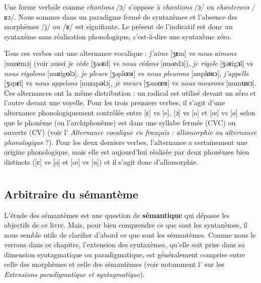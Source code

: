 {     Une forme verbale comme \textit{chantons} /ɔ/ s’oppose à \textit{chantions} /ɔ/ ou \textit{chanterons} /ʁɔ/. Nous sommes dans un paradigme fermé de syntaxèmes et l’absence des morphèmes /j/ ou /ʁ/ est signifiante. Le présent de l’indicatif est donc un syntaxème sans réalisation phonologique, c’est-à-dire une syntaxème zéro.

     Tous ces verbes ont une alternance vocalique : \textit{j’aime} [ʒ\textbf{ɛ}m] vs \textit{nous aimons} [nuz\textbf{e}mɔ] (voir aussi \textit{je cède} [ʒǝs\textbf{ɛ}d] vs \textit{nous cédons} [nus\textbf{e}dɔ]), \textit{je rigole} [ʒǝʁig\textbf{ɔ}l] vs \textit{nous rigolons} [nuʁig\textbf{o}lɔ], \textit{je pleure} [ʒǝpl\textbf{œ}ʁ] vs \textit{nous pleurons} [nupl\textbf{ø}ʁɔ], \textit{j’appelle} [ʒap\textbf{ɛ}l] vs \textit{nous appelons} [nuzap\textbf{ǝ}lɔ], \textit{je meurs} [ʒǝm\textbf{œ}ʁ] vs \textit{nous mourons} [num\textbf{u}ʁɔ]. Ces alternances ont la même distribution : un radical est utilisé devant un zéro et l’autre devant une voyelle. Pour les trois premiers verbes, il s’agit d’une alternance phonologiquement contrôlée entre [ɛ] vs [e], [ɔ] vs [o] et [œ] vs [ø] selon que le phonème (ou l’archiphonème) est dans une syllabe fermée (CVC) ou ouverte (CV) (voir l’ \textit{Alternance vocalique en français : allomorphie ou alternance phonologique} ?). Pour les deux derniers verbes, l’alternance a certainement une origine phonologique, mais elle est aujourd’hui réalisée par deux phonèmes bien distincts ([ɛ] vs [ǝ] et [œ] vs [u]) et il s’agit donc d’allomorphie.
}
\chapter{}\label{sec:2.3}

\section{Arbitraire du sémantème}\label{sec:2.3.0}

L’étude des sémantèmes est une question de \textbf{sémantique} qui dépasse les objectifs de ce livre. Mais, pour bien comprendre ce que sont les syntaxèmes, il nous semble utile de clarifier d’abord ce que sont les sémantèmes. Comme nous le verrons dans ce chapitre, l’extension des syntaxèmes, qu’elle soit prise dans sa dimension syntagmatique ou paradigmatique, est généralement comprise entre celle des morphèmes et celle des sémantèmes (voir notamment l’ sur les \textit{Extensions paradigmatique et syntagmatique}).

